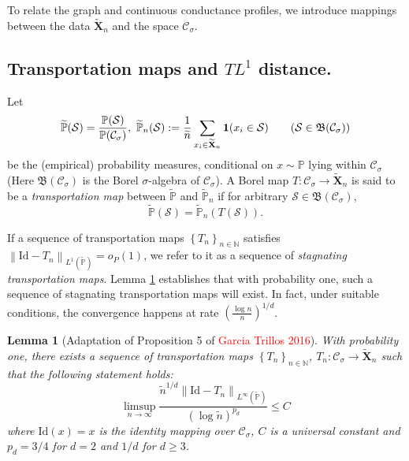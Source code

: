 \documentclass{article}
\newcommand{\norm}[1]{\left\lVert#1\right\rVert}
\newcommand{\set}[1]{\left\{#1\right\}}
\newcommand{\seq}[1]{\set{#1}_{n \in \N}}
\newcommand{\N}{\mathbb{N}}
\newcommand{\Xbf}{\mathbf{X}}
\newcommand{\Cset}{\mathcal{C}}
\newcommand{\Sset}{\mathcal{S}}
\newcommand{\Csig}{\Cset_{\sigma}}
\newcommand{\Pbb}{\mathbb{P}}
\newcommand{\1}{\mathbf{1}}
\theoremstyle{alden}
\theoremstyle{aldenthm}
\newtheorem{lemma}{Lemma}
\theoremstyle{remark}
\begin{document}
To relate the graph and continuous conductance profiles, we introduce mappings between the data $\widetilde{\Xbf}_n$ and the space $\Csig$. 

\subsection{Transportation maps and $TL^1$ distance. }
Let
\begin{equation*}
\widetilde{\Pbb}(\Sset) = \frac{\Pbb(\Sset)}{\Pbb(\Csig)}, ~ \widetilde{\Pbb}_{n}(\Sset) := \frac{1}{\widetilde{n}} \sum_{x_i \in \widetilde{\Xbf}_n} \1(x_i \in \Sset) \tag{$\Sset \in \mathfrak{B}(\Csig)$}
\end{equation*} 
be the (empirical) probability measures, conditional on $x \sim \Pbb$ lying within $\Csig$ (Here $\mathfrak{B}(\Csig)$ is the Borel $\sigma$-algebra of $\Csig$). A Borel map $T: \Csig \to \widetilde{\Xbf}_n$ is said to be a \emph{transportation map} between $\widetilde{\Pbb}$ and $\widetilde{\Pbb}_n$ if for arbitrary $\Sset \in \mathfrak{B}(\Csig)$,  
\begin{equation*}
\widetilde{\Pbb}(\Sset) = \widetilde{\Pbb}_n(T(\Sset)).
\end{equation*}

If a sequence of transportation maps $\seq{T_n}$ satisfies $\norm{\mathrm{Id} - T_n}_{L^{1}(\widetilde{\Pbb})} = o_P(1)$, we refer to it as a sequence of \emph{stagnating transportation maps}. Lemma \ref{lem: stagnating_transportation_maps} establishes that with probability one, such a sequence of stagnating transportation maps will exist.
In fact, under suitable conditions, the convergence happens at rate $\left(\frac{\log n}{n}\right)^{1/d}$. 

\begin{lemma}[Adaptation of Proposition 5 of \textcolor{red}{Garcia Trillos 2016}]
	\label{lem: stagnating_transportation_maps}
	With probability one, there exists a sequence of transportation maps $\seq{T_n}$, $T_n: \Csig \to \widetilde{\Xbf}_n$ such that the following statement holds:
	\begin{equation*}
	\limsup_{n \to \infty} \frac{\widetilde{n}^{1/d} \norm{\mathrm{Id} - T_n}_{L^{\infty}(\widetilde{\Pbb})}}{(\log \widetilde{n})^{p_d}} \leq C
	\end{equation*}
	where $\mathrm{Id}(x) = x$ is the identity mapping over $\Csig$, $C$ is a universal constant and $p_d = 3/4$ for $d = 2$ and $1/d$ for $d \geq 3$.
\end{lemma}
\end{document}
